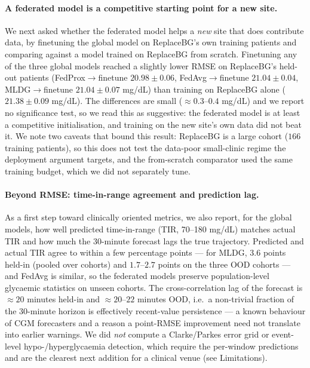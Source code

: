 \documentclass[10pt,letterpaper]{article}
\begin{document}
\paragraph{A federated model is a competitive starting point for a new site.} We
next asked whether the federated model helps a \emph{new} site that does
contribute data, by finetuning the global model on ReplaceBG's own training
patients and comparing against a model trained on ReplaceBG from scratch.
Finetuning any of the three global models reached a slightly lower RMSE on
ReplaceBG's held-out patients (FedProx$\rightarrow$finetune $20.98 \pm 0.06$,
FedAvg$\rightarrow$finetune $21.04 \pm 0.04$, MLDG$\rightarrow$finetune
$21.04 \pm 0.07$ mg/dL) than training on ReplaceBG alone
($21.38 \pm 0.09$ mg/dL). The differences are small ($\approx 0.3$--$0.4$ mg/dL)
and we report no significance test, so we read this as suggestive: the federated
model is at least a competitive initialisation, and training on the new site's
own data did not beat it. We note two caveats that bound this result: ReplaceBG
is a large cohort ($166$ training patients), so this does not test the
data-poor small-clinic regime the deployment argument targets, and the
from-scratch comparator used the same training budget, which we did not
separately tune.

\paragraph{Beyond RMSE: time-in-range agreement and prediction lag.} As a first
step toward clinically oriented metrics, we also report, for the global models,
how well predicted time-in-range (TIR, 70--180 mg/dL) matches actual TIR and how
much the 30-minute forecast lags the true trajectory. Predicted and actual TIR
agree to within a few percentage points --- for MLDG, $3.6$ points held-in
(pooled over cohorts) and $1.7$--$2.7$ points on the three OOD cohorts --- and
FedAvg is similar, so the federated models preserve population-level glycaemic
statistics on unseen cohorts. The cross-correlation lag of the forecast is
$\approx 20$ minutes held-in and $\approx 20$--$22$ minutes OOD, i.e.\ a
non-trivial fraction of the 30-minute horizon is effectively recent-value
persistence --- a known behaviour of CGM forecasters and a reason a point-RMSE
improvement need not translate into earlier warnings. We did \emph{not} compute a
Clarke/Parkes error grid or event-level hypo-/hyperglycaemia detection, which
require the per-window predictions and are the clearest next addition for a
clinical venue (see Limitations).
\end{document}

